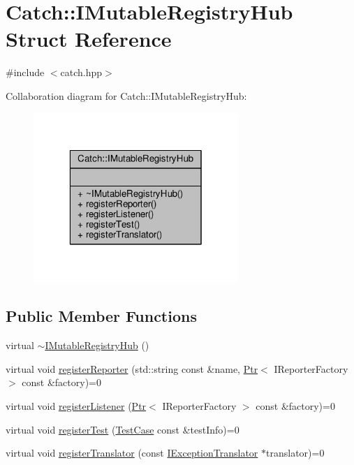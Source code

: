 \hypertarget{struct_catch_1_1_i_mutable_registry_hub}{\section{Catch\-:\-:I\-Mutable\-Registry\-Hub Struct Reference}
\label{struct_catch_1_1_i_mutable_registry_hub}
}


{\ttfamily \#include $<$catch.\-hpp$>$}



Collaboration diagram for Catch\-:\-:I\-Mutable\-Registry\-Hub\-:
\nopagebreak
\begin{figure}[H]
\begin{center}
\leavevmode
\includegraphics[width=220pt]{struct_catch_1_1_i_mutable_registry_hub__coll__graph}
\end{center}
\end{figure}
\subsection*{Public Member Functions}
\begin{DoxyCompactItemize}
\item 
virtual \hyperlink{struct_catch_1_1_i_mutable_registry_hub_a759ca1e044e19f905fb4d306f1367193}{$\sim$\-I\-Mutable\-Registry\-Hub} ()
\item 
virtual void \hyperlink{struct_catch_1_1_i_mutable_registry_hub_aab72d0aa1fa14627f1a6a4c893ae0a12}{register\-Reporter} (std\-::string const \&name, \hyperlink{class_catch_1_1_ptr}{Ptr}$<$ I\-Reporter\-Factory $>$ const \&factory)=0
\item 
virtual void \hyperlink{struct_catch_1_1_i_mutable_registry_hub_ae06fcb90ba3f2b389d450cd81e229276}{register\-Listener} (\hyperlink{class_catch_1_1_ptr}{Ptr}$<$ I\-Reporter\-Factory $>$ const \&factory)=0
\item 
virtual void \hyperlink{struct_catch_1_1_i_mutable_registry_hub_a11b85c6744d88c9f83fe16ad4a8dd451}{register\-Test} (\hyperlink{class_catch_1_1_test_case}{Test\-Case} const \&test\-Info)=0
\item 
virtual void \hyperlink{struct_catch_1_1_i_mutable_registry_hub_ae6825365102693cf7707db022a2c2b49}{register\-Translator} (const \hyperlink{struct_catch_1_1_i_exception_translator}{I\-Exception\-Translator} $\ast$translator)=0
\end{DoxyCompactItemize}


